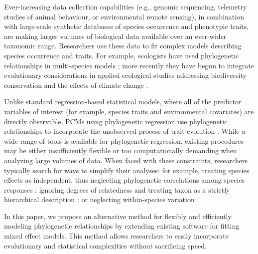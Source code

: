 \documentclass[12pt]{article}
\begin{document}
Ever-increasing data collection capabilities (e.g., genomic sequencing, telemetry studies of animal behaviour, or environmental remote sensing), in combination with large-scale synthetic databases of species occurrence and phenotypic traits, are making larger volumes of biological data available over an ever-wider taxonomic range.
Researchers use these data to fit complex models describing species occurrence and traits.
For example, ecologists have used phylogenetic relationships in multi-species models \citep{garland1992procedures, freckleton2002phylogenetic, ord2010adaptation, davies2013phylogenetic}; more recently they have begun to integrate evolutionary considerations in applied ecological studies addressing biodiversity conservation and the effects of climate change \citep{winter2013phylogenetic, santamaria2012evolution, lankau2011incorporating, lavergne2010biodiversity, mace2008evolutionary}.

Unlike standard regression-based statistical models, where all of the predictor variables of interest (for example, species traits and environmental covariates) are directly observable,  PCMs using phylogenetic regression use phylogenetic relationships to incorporate the unobserved process of trait evolution \citep{felsenstein1985phylogenies, butler2004phylogenetic, hansen2012interpreting}. 
While a wide range of tools is available for phylogenetic regression, existing procedures may be either insufficiently flexible or too computationally demanding when analyzing large volumes of data.
When faced with these constraints, researchers typically search for ways to simplify their analyses: for example, treating species effects as independent, thus neglecting phylogenetic correlations among species responses \citep{bunnefeld2012island}; ignoring degrees of relatedness and treating taxon as a strictly hierarchical description \citep{tella1999habitat}; or neglecting within-species variation \citep{ord2010adaptation}.

In this paper, we propose an alternative method for flexibly and efficiently modeling phylogenetic relationships by extending existing software for fitting mixed effect models. 
This method allows researchers to easily incorporate evolutionary and statistical complexities without sacrificing speed.
\end{document}
